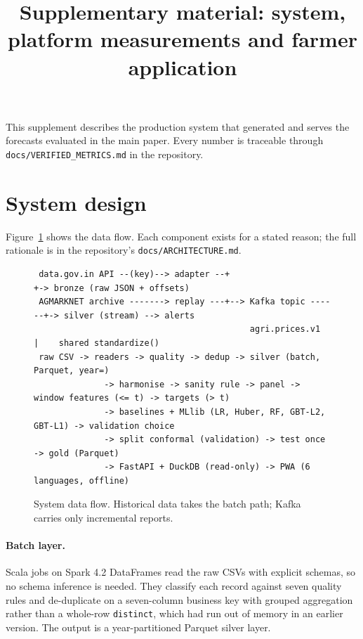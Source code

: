 \documentclass[10pt]{article}
\title{Supplementary material: system, platform measurements and farmer application}
\author{}\date{}
\begin{document}
\maketitle
\noindent This supplement describes the production system that generated and serves the forecasts evaluated in the main paper. Every number is traceable through \texttt{docs/VERIFIED\_METRICS.md} in the repository.
\section{System design}\label{sec:system}

Figure~\ref{fig:arch} shows the data flow. Each component exists for a stated reason; the full rationale is in the
repository's \texttt{docs/ARCHITECTURE.md}.

\begin{figure}[t]
\centering
\small
\begin{verbatim}
 data.gov.in API --(key)--> adapter --+                      +-> bronze (raw JSON + offsets)
 AGMARKNET archive -------> replay ---+--> Kafka topic ------+-> silver (stream) --> alerts
                                           agri.prices.v1     |    shared standardize()
 raw CSV -> readers -> quality -> dedup -> silver (batch, Parquet, year=)
              -> harmonise -> sanity rule -> panel -> window features (<= t) -> targets (> t)
              -> baselines + MLlib (LR, Huber, RF, GBT-L2, GBT-L1) -> validation choice
              -> split conformal (validation) -> test once -> gold (Parquet)
              -> FastAPI + DuckDB (read-only) -> PWA (6 languages, offline)
\end{verbatim}
\caption{System data flow. Historical data takes the batch path; Kafka carries only incremental reports.}
\label{fig:arch}
\end{figure}

\paragraph{Batch layer.}
Scala jobs on Spark 4.2 DataFrames read the raw CSVs with explicit schemas, so no schema inference is needed.
They classify each record against seven quality rules and de-duplicate on a seven-column business key with grouped aggregation rather than a whole-row \texttt{distinct}, which had run out of memory in an earlier version.
The output is a year-partitioned Parquet silver layer.
\end{document}

